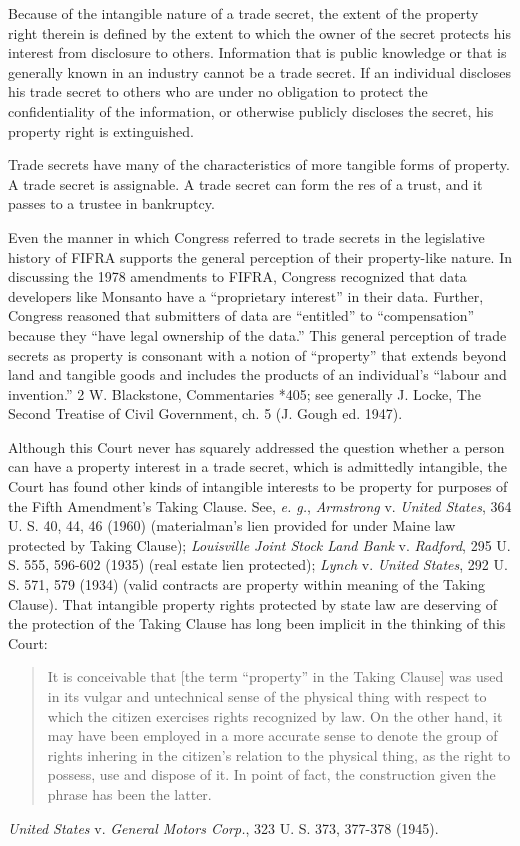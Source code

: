 Because of the intangible nature of a trade secret, the extent of the property
right therein is defined by the extent to which the owner of the secret protects
his interest from disclosure to others.
Information that is public knowledge or that is generally known in an
industry cannot be a trade secret. If an
individual discloses his trade secret to others who are under no obligation to
protect the confidentiality of the information, or otherwise publicly discloses
the secret, his property right is extinguished.

Trade secrets have many of the characteristics of more tangible forms of
property. A trade secret is assignable.
A trade secret can form the res of a trust,
and it passes to a trustee in bankruptcy.

Even the manner in which Congress referred to trade secrets in the legislative
history of FIFRA supports the general perception of their property-like nature.
In discussing the 1978 amendments to FIFRA, Congress recognized that data
developers like Monsanto have a ``proprietary interest'' in their data.
Further, Congress reasoned that submitters of data are
``entitled'' to ``compensation'' because they ``have legal ownership of the
data.'' This general
perception of trade secrets as property is consonant with a notion of
``property'' that extends beyond land and tangible goods and includes the
products of an individual's ``labour and invention.'' 2 W. Blackstone,
Commentaries *405; see generally J. Locke, The Second Treatise of Civil
Government, ch. 5 (J. Gough ed. 1947).

Although this Court never has squarely addressed the question whether a person
can have a property interest in a trade secret, which is admittedly intangible,
the Court has found other kinds of intangible interests to be property for
purposes of the Fifth Amendment's Taking Clause. See, \textit{e. g.},
\textit{Armstrong} v. \textit{United States}, 364 U. S. 40, 44, 46 (1960)
(materialman's lien provided for under Maine law protected by Taking Clause);
\textit{Louisville Joint Stock Land Bank} v. \textit{Radford}, 295 U. S. 555,
596-602 (1935) (real estate lien protected); \textit{Lynch} v. \textit{United
States}, 292 U. S. 571, 579 (1934) (valid contracts are property within meaning
of the Taking Clause). That intangible property rights protected by state law
are deserving of the protection of the Taking Clause has long been implicit in
the thinking of this Court:
\begin{quote}
It is conceivable that [the term ``property'' in the Taking
Clause] was used in its vulgar and untechnical sense of the physical thing with
respect to which the citizen exercises rights recognized by law. On the other
hand, it may have been employed in a more accurate sense to denote the group of
rights inhering in the citizen's relation to the physical thing, as the right to
possess, use and dispose of it. In point of fact, the construction given the
phrase has been the latter.
\end{quote}
\textit{United States} v. \textit{General Motors
Corp.}, 323 U. S. 373, 377-378 (1945).

